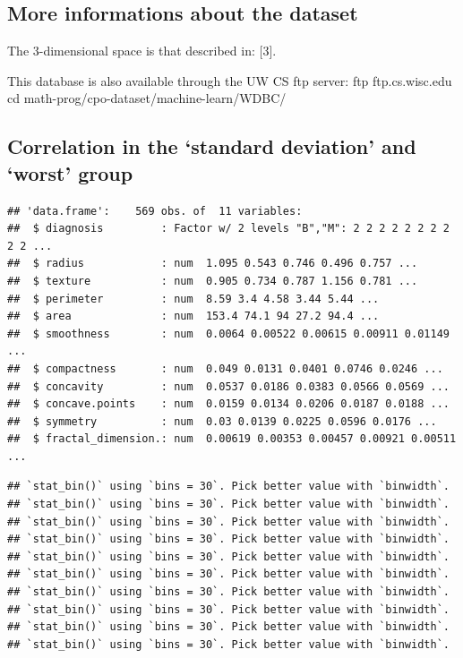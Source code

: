 \documentclass[
  11pt,
]{article}
\begin{document}
\hypertarget{more-informations-about-the-dataset}{%
\subsection{More informations about the
dataset}\label{more-informations-about-the-dataset}}

The 3-dimensional space is that described in: {[}3{]}.

This database is also available through the UW CS ftp server: ftp
ftp.cs.wisc.edu cd math-prog/cpo-dataset/machine-learn/WDBC/

\hypertarget{correlation-in-the-standard-deviation-and-worst-group}{%
\subsection{Correlation in the `standard deviation' and `worst'
group}\label{correlation-in-the-standard-deviation-and-worst-group}}

\begin{verbatim}
## 'data.frame':    569 obs. of  11 variables:
##  $ diagnosis         : Factor w/ 2 levels "B","M": 2 2 2 2 2 2 2 2 2 2 ...
##  $ radius            : num  1.095 0.543 0.746 0.496 0.757 ...
##  $ texture           : num  0.905 0.734 0.787 1.156 0.781 ...
##  $ perimeter         : num  8.59 3.4 4.58 3.44 5.44 ...
##  $ area              : num  153.4 74.1 94 27.2 94.4 ...
##  $ smoothness        : num  0.0064 0.00522 0.00615 0.00911 0.01149 ...
##  $ compactness       : num  0.049 0.0131 0.0401 0.0746 0.0246 ...
##  $ concavity         : num  0.0537 0.0186 0.0383 0.0566 0.0569 ...
##  $ concave.points    : num  0.0159 0.0134 0.0206 0.0187 0.0188 ...
##  $ symmetry          : num  0.03 0.0139 0.0225 0.0596 0.0176 ...
##  $ fractal_dimension.: num  0.00619 0.00353 0.00457 0.00921 0.00511 ...
\end{verbatim}

\begin{verbatim}
## `stat_bin()` using `bins = 30`. Pick better value with `binwidth`.
## `stat_bin()` using `bins = 30`. Pick better value with `binwidth`.
## `stat_bin()` using `bins = 30`. Pick better value with `binwidth`.
## `stat_bin()` using `bins = 30`. Pick better value with `binwidth`.
## `stat_bin()` using `bins = 30`. Pick better value with `binwidth`.
## `stat_bin()` using `bins = 30`. Pick better value with `binwidth`.
## `stat_bin()` using `bins = 30`. Pick better value with `binwidth`.
## `stat_bin()` using `bins = 30`. Pick better value with `binwidth`.
## `stat_bin()` using `bins = 30`. Pick better value with `binwidth`.
## `stat_bin()` using `bins = 30`. Pick better value with `binwidth`.
\end{verbatim}
\end{document}
